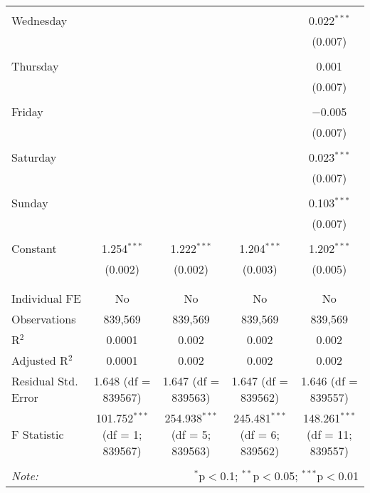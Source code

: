 \documentclass[
]{article}
\begin{document}
\begin{table}[!htbp]
{\begin{tabular}{@{\extracolsep{5pt}}lcccc}
  & & & & \\ 
 Wednesday &  &  &  & 0.022$^{***}$ \\ 
  &  &  &  & (0.007) \\ 
  & & & & \\ 
 Thursday &  &  &  & 0.001 \\ 
  &  &  &  & (0.007) \\ 
  & & & & \\ 
 Friday &  &  &  & $-$0.005 \\ 
  &  &  &  & (0.007) \\ 
  & & & & \\ 
 Saturday &  &  &  & 0.023$^{***}$ \\ 
  &  &  &  & (0.007) \\ 
  & & & & \\ 
 Sunday &  &  &  & 0.103$^{***}$ \\ 
  &  &  &  & (0.007) \\ 
  & & & & \\ 
 Constant & 1.254$^{***}$ & 1.222$^{***}$ & 1.204$^{***}$ & 1.202$^{***}$ \\ 
  & (0.002) & (0.002) & (0.003) & (0.005) \\ 
  & & & & \\ 
\hline \\[-1.8ex] 
Individual FE & No & No & No & No \\ 
Observations & 839,569 & 839,569 & 839,569 & 839,569 \\ 
R$^{2}$ & 0.0001 & 0.002 & 0.002 & 0.002 \\ 
Adjusted R$^{2}$ & 0.0001 & 0.002 & 0.002 & 0.002 \\ 
Residual Std. Error & 1.648 (df = 839567) & 1.647 (df = 839563) & 1.647 (df = 839562) & 1.646 (df = 839557) \\ 
F Statistic & 101.752$^{***}$ (df = 1; 839567) & 254.938$^{***}$ (df = 5; 839563) & 245.481$^{***}$ (df = 6; 839562) & 148.261$^{***}$ (df = 11; 839557) \\ 
\hline 
\hline \\[-1.8ex] 
\textit{Note:}  & \multicolumn{4}{r}{$^{*}$p$<$0.1; $^{**}$p$<$0.05; $^{***}$p$<$0.01} \\ 
\end{tabular}
} 
\end{table} 
\newpage
\end{document}
